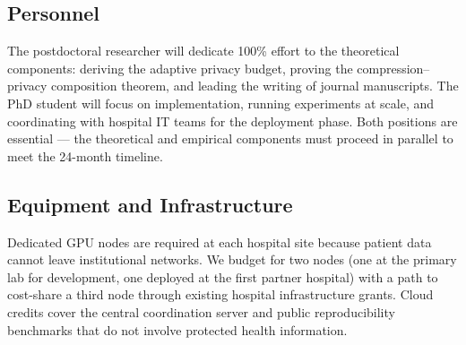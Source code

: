 \subsection{Personnel}

The postdoctoral researcher will dedicate 100\% effort to the theoretical components:
deriving the adaptive privacy budget, proving the compression--privacy composition theorem,
and leading the writing of journal manuscripts. The PhD student will focus on
implementation, running experiments at scale, and coordinating with hospital IT teams for
the deployment phase. Both positions are essential — the theoretical and empirical
components must proceed in parallel to meet the 24-month timeline.

\subsection{Equipment and Infrastructure}

Dedicated GPU nodes are required at each hospital site because patient data cannot leave
institutional networks. We budget for two nodes (one at the primary lab for development,
one deployed at the first partner hospital) with a path to cost-share a third node through
existing hospital infrastructure grants. Cloud credits cover the central coordination server
and public reproducibility benchmarks that do not involve protected health information.

